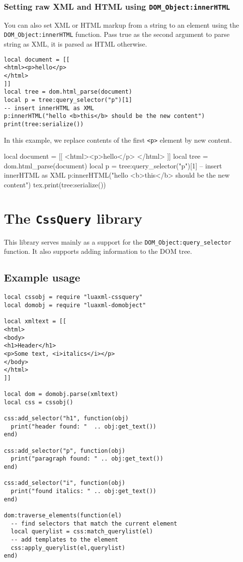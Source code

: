 \documentclass{ltxdoc}
\begin{document}
\subsubsection{Setting raw XML and HTML using \texttt{DOM\_Object:innerHTML}}

You can also set XML or HTML markup from a string to an element using the \texttt{DOM\_Object:innerHTML} function. 
Pass true as the second argument to parse string as XML, it is parsed as HTML otherwise.


\begin{verbatim}
local document = [[
<html><p>hello</p>
</html>
]]
local tree = dom.html_parse(document)
local p = tree:query_selector("p")[1]
-- insert innerHTML as XML
p:innerHTML("hello <b>this</b> should be the new content")
print(tree:serialize())
\end{verbatim}

In this example, we replace contents of the first \verb|<p>| element by new content. 

\begin{framed}
  \ttfamily
  \begin{luacode*}
local document = [[
<html><p>hello</p>
</html>
]]
local tree = dom.html_parse(document)
local p = tree:query_selector("p")[1]
-- insert innerHTML as XML
p:innerHTML("hello <b>this</b> should be the new content")
tex.print(tree:serialize())
  \end{luacode*}
\end{framed}



\section{The \texttt{CssQuery} library}
\label{sec:cssquery_library}

This library serves mainly as a support for the
\texttt{DOM\_Object:query\_selector} function. It also supports adding
information to the DOM tree.

\subsection{Example usage}

\begin{verbatim}
local cssobj = require "luaxml-cssquery"
local domobj = require "luaxml-domobject"

local xmltext = [[
<html>
<body>
<h1>Header</h1>
<p>Some text, <i>italics</i></p>
</body>
</html>
]]

local dom = domobj.parse(xmltext)
local css = cssobj()

css:add_selector("h1", function(obj)
  print("header found: "  .. obj:get_text())
end)

css:add_selector("p", function(obj)
  print("paragraph found: " .. obj:get_text())
end)

css:add_selector("i", function(obj)
  print("found italics: " .. obj:get_text())
end)

dom:traverse_elements(function(el)
  -- find selectors that match the current element
  local querylist = css:match_querylist(el)
  -- add templates to the element
  css:apply_querylist(el,querylist)
end)
\end{verbatim}
\end{document}
